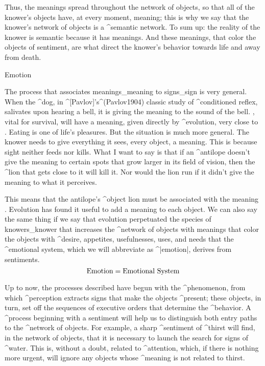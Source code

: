 Thus, the meanings spread throughout the network of objects, so that all
of the knower's objects have, at every moment, meaning; this is why we
say that the knower's network of objects is a ^{semantic network}. To
sum up: the reality of the knower is semantic because it has meanings.
And these meanings, that color the objects of sentiment, are what direct
the knower's behavior towards life and away from death.


\Section Emotion

The process that associates meanings_{meaning} to signs_{sign} is very
general. When the ^{dog}, in ^[Pavlov]'s^(Pavlov1904) classic study of
^{conditioned reflex}, salivates upon hearing a bell, it is giving the
meaning  to the sound of the bell. , vital
for survival, will have a meaning, given directly by ^{evolution}, very
close to . Eating is one of life's pleasures. But the
situation is much more general. The knower needs to give everything it
sees, every object, a meaning. This is because sight neither feeds nor
kills. What I want to say is that if an ^{antilope} doesn't give the
meaning  to certain spots that grow larger in
its field of vision, then the ^{lion} that gets close to it will kill
it. Nor would the lion run if it didn't give the meaning  to what it perceives.

This means that the antilope's ^{object} lion must be associated with
the meaning . Evolution has found it useful to add a
meaning to each object. We can also say the same thing if we say that
evolution perpetuated the species of knowers_{knower} that increases the
^{network of objects} with meanings that color the objects with
^{desire}, appetites, usefulnesses, uses, and needs that the ^{emotional
system}, which we will abbreviate as ^|emotion|, derives from
sentiments.
$$\hbox{Emotion} = \hbox{Emotional System}$$

Up to now, the processes described have begun with the ^{phenomenon},
from which ^{perception} extracts signs that make the objects
^{present}; these objects, in turn, set off the sequences of executive
orders that determine the ^{behavior}. A ^{process} beginning with a
\hbox{sentiment} will help us to distinguish both entry paths to the %
^{network of objects}. For example, a sharp ^{sentiment} of ^{thirst} will
find, in the network of objects, that it is necessary to launch the
search for signs of ^{water}. This is, without a doubt, related to
^{attention}, which, if there is nothing more urgent, will ignore any
objects whose ^{meaning} is not related to thirst.

